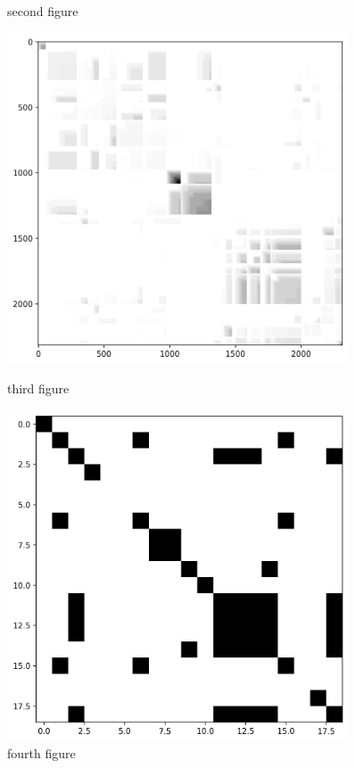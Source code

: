\begin{figure}[ht]
\begin{minipage}{0.45\textwidth}
        \caption[]{second figure}
    \end{minipage}
    \vfill
    \begin{minipage}{0.45\textwidth}
        \centering
        \includegraphics[width=0.9\textwidth]{figures/images/salami_391_Q_matrix.png} %
        \caption[]{third figure}
    \end{minipage}\hfill
    \begin{minipage}{0.45\textwidth}
        \centering
        \includegraphics[width=0.9\textwidth]{figures/images/salami_391_binary transitive matrix.png} %
        \caption[]{fourth figure}
    \end{minipage}
\end{figure}

\newpage